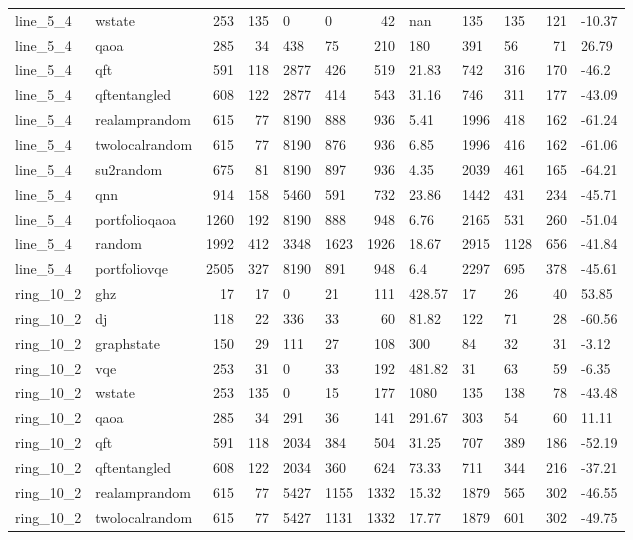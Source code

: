 \begin{longtable}{llrrllrlllrl}
line\_5\_4 & wstate & 253 & 135 & 0 & 0 & 42 & nan & 135 & 135 & 121 & -10.37 \\
line\_5\_4 & qaoa & 285 & 34 & 438 & 75 & 210 & 180 & 391 & 56 & 71 & 26.79 \\
line\_5\_4 & qft & 591 & 118 & 2877 & 426 & 519 & 21.83 & 742 & 316 & 170 & -46.2 \\
line\_5\_4 & qftentangled & 608 & 122 & 2877 & 414 & 543 & 31.16 & 746 & 311 & 177 & -43.09 \\
line\_5\_4 & realamprandom & 615 & 77 & 8190 & 888 & 936 & 5.41 & 1996 & 418 & 162 & -61.24 \\
line\_5\_4 & twolocalrandom & 615 & 77 & 8190 & 876 & 936 & 6.85 & 1996 & 416 & 162 & -61.06 \\
line\_5\_4 & su2random & 675 & 81 & 8190 & 897 & 936 & 4.35 & 2039 & 461 & 165 & -64.21 \\
line\_5\_4 & qnn & 914 & 158 & 5460 & 591 & 732 & 23.86 & 1442 & 431 & 234 & -45.71 \\
line\_5\_4 & portfolioqaoa & 1260 & 192 & 8190 & 888 & 948 & 6.76 & 2165 & 531 & 260 & -51.04 \\
line\_5\_4 & random & 1992 & 412 & 3348 & 1623 & 1926 & 18.67 & 2915 & 1128 & 656 & -41.84 \\
line\_5\_4 & portfoliovqe & 2505 & 327 & 8190 & 891 & 948 & 6.4 & 2297 & 695 & 378 & -45.61 \\
ring\_10\_2 & ghz & 17 & 17 & 0 & 21 & 111 & 428.57 & 17 & 26 & 40 & 53.85 \\
ring\_10\_2 & dj & 118 & 22 & 336 & 33 & 60 & 81.82 & 122 & 71 & 28 & -60.56 \\
ring\_10\_2 & graphstate & 150 & 29 & 111 & 27 & 108 & 300 & 84 & 32 & 31 & -3.12 \\
ring\_10\_2 & vqe & 253 & 31 & 0 & 33 & 192 & 481.82 & 31 & 63 & 59 & -6.35 \\
ring\_10\_2 & wstate & 253 & 135 & 0 & 15 & 177 & 1080 & 135 & 138 & 78 & -43.48 \\
ring\_10\_2 & qaoa & 285 & 34 & 291 & 36 & 141 & 291.67 & 303 & 54 & 60 & 11.11 \\
ring\_10\_2 & qft & 591 & 118 & 2034 & 384 & 504 & 31.25 & 707 & 389 & 186 & -52.19 \\
ring\_10\_2 & qftentangled & 608 & 122 & 2034 & 360 & 624 & 73.33 & 711 & 344 & 216 & -37.21 \\
ring\_10\_2 & realamprandom & 615 & 77 & 5427 & 1155 & 1332 & 15.32 & 1879 & 565 & 302 & -46.55 \\
ring\_10\_2 & twolocalrandom & 615 & 77 & 5427 & 1131 & 1332 & 17.77 & 1879 & 601 & 302 & -49.75 \\

\end{longtable}
